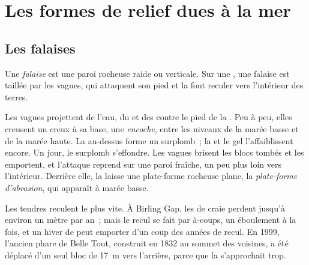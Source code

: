 \section{Les formes de relief dues à la mer}

\subsection{Les falaises}

\begin{definition}[Falaise]\label{def:g9:landforms:cliff}
Une \emph{falaise} est une paroi rocheuse raide ou verticale.
Sur une , une falaise est taillée par les vagues, qui attaquent son
pied et la font reculer vers l'intérieur des terres.
\end{definition}

Les vagues projettent de l'eau, du  et des  contre le pied de la
. Peu à peu, elles creusent un creux à sa base, une \emph{encoche},
entre les niveaux de la marée basse et de la marée haute. La 
au-dessus forme un surplomb~; la  et le gel l'affaiblissent encore.
Un jour, le surplomb s'effondre. Les vagues brisent les blocs tombés et les
emportent, et l'attaque reprend sur une paroi fraîche, un peu plus loin
vers l'intérieur. Derrière elle, la  laisse une plate-forme rocheuse
plane, la \emph{plate-forme d'abrasion}, qui
apparaît à marée basse.

Les  tendres reculent le plus vite. À Birling Gap, les  de
craie perdent jusqu'à environ un mètre par an~; mais le recul se fait par
à-coups, un éboulement à la fois, et un hiver de  peut emporter
d'un coup des années de recul. En 1999, l'ancien phare de Belle Tout,
construit en 1832 au sommet des  voisines, a été déplacé d'un seul
bloc de \qty{17}{m} vers l'arrière, parce que la  s'approchait
trop.

